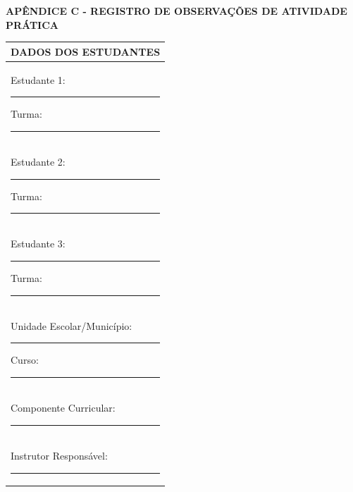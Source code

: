 \documentclass[12pt,a4paper]{article}
\begin{document}
\begin{center}


{\sffamily\bfseries
\fontsize{11.5}{12}\selectfont
APÊNDICE C - REGISTRO DE OBSERVAÇÕES DE ATIVIDADE PRÁTICA
}

\vspace{0.18cm}


\noindent
\begin{tabularx}{\textwidth}{|X|}
\hline

\multicolumn{1}{|c|}{
    \fontsize{9}{10}\selectfont
    \textbf{DADOS DOS ESTUDANTES}
}
\\[-2pt]
\hline

\fontsize{8.5}{9.5}\selectfont

Estudante 1:
\hspace{0.03cm}\rule{7.9cm}{0.1pt}
\hfill
Turma:
\hspace{0.03cm}\rule{1.85cm}{0.1pt}
\\[1pt]

Estudante 2:
\hspace{0.03cm}\rule{7.9cm}{0.1pt}
\hfill
Turma:
\hspace{0.03cm}\rule{1.85cm}{0.1pt}
\\[1pt]

Estudante 3:
\hspace{0.03cm}\rule{7.9cm}{0.1pt}
\hfill
Turma:
\hspace{0.03cm}\rule{1.85cm}{0.1pt}
\\[1pt]

Unidade Escolar/Município:
\hspace{0.03cm}\rule{5.15cm}{0.1pt}
\hfill
Curso:
\hspace{0.03cm}\rule{4.85cm}{0.1pt}
\\[1pt]

Componente Curricular:
\hspace{0.03cm}\rule{12.1cm}{0.1pt}
\\[1pt]

Instrutor Responsável:
\hspace{0.03cm}\rule{11.8cm}{0.1pt}
\\[-2pt]

\hline
\end{tabularx}


\end{center}
\end{document}
